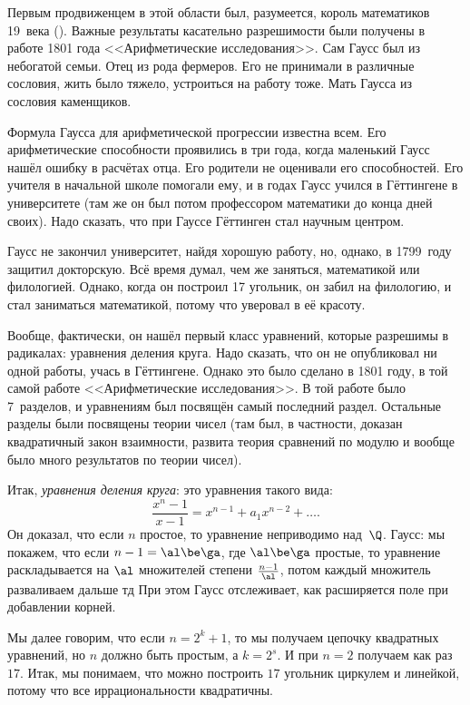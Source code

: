 \documentclass[a4paper,oneside,fleqn,10pt]{article}
\begin{document}
Первым продвиженцем в этой области был, разумеется, король математиков
19~века 
().  Важные результаты касательно разрешимости были
получены в работе 1801 года <<Арифметические исследования>>.  Сам
Гаусс был из небогатой семьи. Отец из рода фермеров. Его не принимали
в различные сословия, жить было тяжело, устроиться на работу тоже.
Мать Гаусса из сословия каменщиков.

Формула Гаусса для арифметической прогрессии известна всем. Его
арифметические способности проявились в три года, когда маленький
Гаусс нашёл ошибку в расчётах отца.  Его родители не оценивали его
способностей. Его учителя в начальной школе помогали ему, и в
 годах Гаусс учился в Гёттингене в университете (там же
он был потом профессором математики до конца дней своих).  Надо
сказать, что при Гауссе Гёттинген стал научным центром.

Гаусс не закончил университет, найдя хорошую работу, но, однако, в
1799~году защитил докторскую.  Всё время думал, чем же заняться,
математикой или филологией. Однако, когда он построил 17 угольник, он
забил на филологию, и стал заниматься математикой, потому что уверовал
в её красоту.

Вообще, фактически, он нашёл первый класс уравнений, которые разрешимы
в радикалах: уравнения деления круга.  Надо сказать, что он не
опубликовал ни одной работы, учась в Гёттингене.  Однако это было
сделано в 1801 году, в той самой работе <<Арифметические
исследования>>.  В той работе было 7~разделов, и уравнениям был
посвящён самый последний раздел.  Остальные разделы были посвящены
теории чисел (там был, в частности, доказан квадратичный закон
взаимности, развита теория сравнений по модулю и вообще было много
результатов по теории чисел).

Итак, \emph{уравнения деления круга}: это уравнения такого вида:
$$\frac{x^n-1}{x-1} = x^{n-1} + a_1 x^{n-2} + \dots.$$ Он доказал, что
если $n$ простое, то уравнение неприводимо над~$\Q$.  Гаусс: мы
покажем, что если $n-1 = \al\be\ga$, где $\al\be\ga$ простые, то
уравнение раскладывается на $\al$ множителей степени
$\frac{n-1}{\al}$, потом каждый множитель разваливаем дальше тд При
этом Гаусс отслеживает, как расширяется поле при добавлении корней.

Мы далее говорим, что если $n=2^k+1$, то мы получаем цепочку
квадратных уравнений, но $n$ должно быть простым, а $k = 2^s$.  И при
$n=2$ получаем как раз $17$. Итак, мы понимаем, что можно построить
$17$ угольник циркулем и линейкой, потому что все иррациональности
квадратичны.
\end{document}
